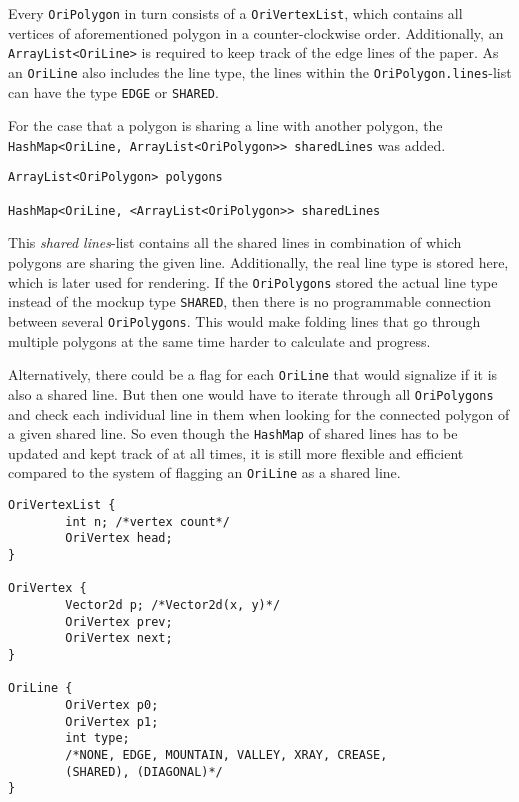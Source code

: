 \noindent Every \texttt{OriPolygon} in turn consists of a \texttt{OriVertexList}, which contains all vertices of aforementioned polygon in a counter-clockwise order. Additionally, an \texttt{ArrayList<OriLine>} is required to keep track of the edge lines of the paper. As an \texttt{OriLine} also includes the line type, the lines within the \texttt{OriPolygon.lines}-list can have the type \texttt{EDGE} or \texttt{SHARED}.

For the case that a polygon is sharing a line with another polygon, the \texttt{HashMap<OriLine, ArrayList<OriPolygon>> sharedLines} was added.

\begin{lstlisting}[label=paperModelImplementation,caption=New Implementation of Paper Model]
ArrayList<OriPolygon> polygons

HashMap<OriLine, <ArrayList<OriPolygon>> sharedLines
\end{lstlisting}

\noindent This \emph{shared lines}-list contains all the shared lines in combination of which polygons are sharing the given line. Additionally, the real line type is stored here, which is later used for rendering. If the \texttt{OriPolygons} stored the actual line type instead of the mockup type \texttt{SHARED}, then there is no programmable connection between several \texttt{OriPolygons}. This would make folding lines that go through multiple polygons at the same time harder to calculate and progress.

Alternatively, there could be a flag for each \texttt{OriLine} that would signalize if it is also a shared line. But then one would have to iterate through all \texttt{OriPolygons} and check each individual line in them when looking for the connected polygon of a given shared line. So even though the \texttt{HashMap} of shared lines has to be updated and kept track of at all times, it is still more flexible and efficient compared to the system of flagging an \texttt{OriLine} as a shared line.

\begin{lstlisting}[label=oriVertexList,caption={OriVertexList, OriVertex, and OriLine}]
OriVertexList {
        int n; /*vertex count*/
        OriVertex head;
}

OriVertex {
        Vector2d p; /*Vector2d(x, y)*/
        OriVertex prev;
        OriVertex next;
}

OriLine {
        OriVertex p0;
        OriVertex p1;
        int type; 
        /*NONE, EDGE, MOUNTAIN, VALLEY, XRAY, CREASE, 
        (SHARED), (DIAGONAL)*/
}
\end{lstlisting}

